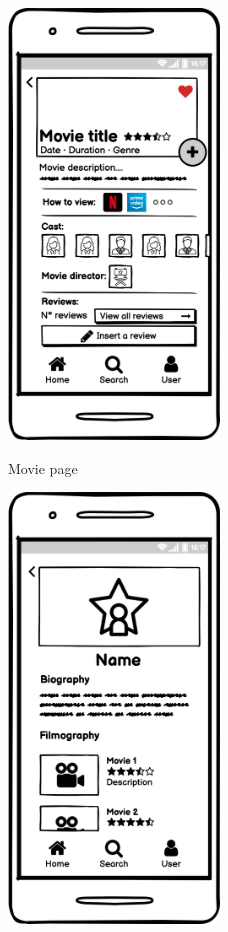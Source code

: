 \documentclass[12pt, a4paper]{article}
\numberwithin{figure}{section}
\begin{document}
\begin{center}
	\begin{minipage}{0.4\textwidth}
		\begin{figure}[H]
			\centering
			\includegraphics[width=0.5\textwidth]{images/mockups/Movie page.png}\\
			\caption{Movie page}
		\end{figure}
	\end{minipage}
	\hspace{0.01\linewidth}
	\begin{minipage}{0.4\textwidth}
		\begin{figure}[H]
			\centering
			\includegraphics[width=0.5\textwidth]{images/mockups/People page.png}\\

\end{figure}
\end{minipage}
\end{center}
\end{document}

